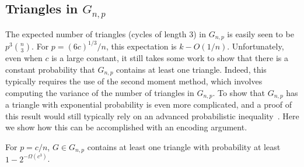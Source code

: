 \documentclass{patmorin}
\begin{document}
\subsection{Triangles in $G_{n,p}$}

The expected number of triangles (cycles of length 3) in $G_{n,p}$ is
easily seen to be $p^3\binom{n}{3}$.  For $p=(6c)^{1/3}/n$, this
expectation is $k-O(1/n)$.  Unfortunately, even when $c$ is a large
constant, it still takes some work to show that there is a constant
probability that $G_{n,p}$ contains at least one triangle. Indeed,
this typically requires the use of the second moment method, which
involves computing the variance of the number of triangles in
$G_{n,p}$. To show that $G_{n, p}$ has a triangle with exponential
probability is even more complicated, and a proof of this result would
still typically rely on an advanced probabilistic
inequality~\cite{alon:probabilistic}. Here we show how this can be accomplished with an encoding argument.

\begin{thm}
  For $p=c/n$, $G \in G_{n,p}$ contains at least one triangle with
  probability at least $1-2^{-\Omega(c^3)}$.
\end{thm}
\end{document}
